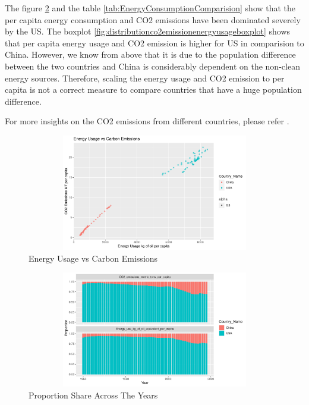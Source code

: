\documentclass[11pt,a4paper,]{article}
\begin{document}
The figure \ref{fig:proportion_countries_yearly} and the table \ref{tab:EnergyConsumptionComparision} show that the per capita energy consumption and CO2 emissions have been dominated severely by the US. The boxplot \ref{fig:distributionco2emissionenergyusageboxplot} shows that per capita energy usage and CO2 emission is higher for US in comparision to China. However, we know from above that it is due to the population difference between the two countries and China is considerably dependent on the non-clean energy sources. Therefore, scaling the energy usage and CO2 emission to per capita is not a correct measure to compare countries that have a huge population difference.

For more insights on the CO2 emissions from different countries, please refer \textcite{countriesC02emissions}.

\begin{figure}[H]
\includegraphics[width=7in, height = 2in]{Figures/energyusage_vs_co2emission-1}
\caption{Energy Usage vs Carbon Emissions}
\label{fig:energyusage_vs_co2emission}
\end{figure}

\begin{figure}[H]
\includegraphics[width=6in, height = 2in]{Figures/proportion_countries_yearly-1}
\caption{Proportion Share Across The Years}
\label{fig:proportion_countries_yearly}
\end{figure}
\end{document}
